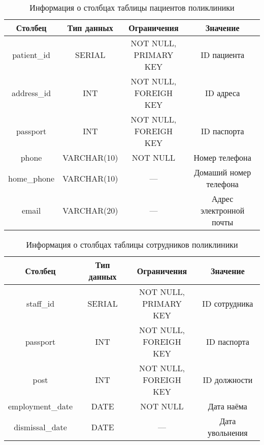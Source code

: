 \begin{table}[h!]
\begin{center}
	\captionsetup{justification=raggedright,singlelinecheck=off,margin=5mm}
	\caption{Информация о столбцах таблицы пациентов поликлиники}
	\begin{tabular}{| c | c | c | c |}
		\hline
		Столбец & Тип данных & Ограничения & Значение \\
		\hline
		patient\_id & SERIAL & \makecell{NOT NULL, \\ PRIMARY KEY} & ID пациента \\
		\hline
		address\_id & INT & \makecell{NOT NULL, \\ FOREIGH KEY} & ID  адреса \\
		\hline
		passport & INT & \makecell{NOT NULL, \\ FOREIGH KEY} & ID паспорта \\
		\hline
		phone & VARCHAR(10) & NOT NULL & Номер телефона \\
		\hline
		home\_phone & VARCHAR(10) & --- & Домаший номер телефона \\
		\hline
		email & VARCHAR(20) & --- & Адрес электронной почты \\
		\hline
	\end{tabular}
	\label{table:patients-columns}
\end{center}
\end{table}

\begin{table}[h!]
\begin{center}
	\captionsetup{justification=raggedright,singlelinecheck=off,margin=5mm}
	\caption{Информация о столбцах таблицы сотрудников поликлиники}
	\begin{tabular}{| c | c | c | c |}
		\hline
		Столбец & Тип данных & Ограничения & Значение \\
		\hline
		staff\_id & SERIAL & \makecell{NOT NULL, \\ PRIMARY KEY} & ID сотрудника \\
		\hline
		passport & INT & \makecell{NOT NULL, \\ FOREIGH KEY} & ID паспорта \\
		\hline
		post & INT &  \makecell{NOT NULL, \\ FOREIGH KEY} & ID должности \\
		\hline
		employment\_date & DATE & NOT NULL& Дата наёма \\
		\hline
		dismissal\_date & DATE & --- & Дата увольнения\\
		\hline
	\end{tabular}
	\label{table:staff-columns}
\end{center}
\end{table}

